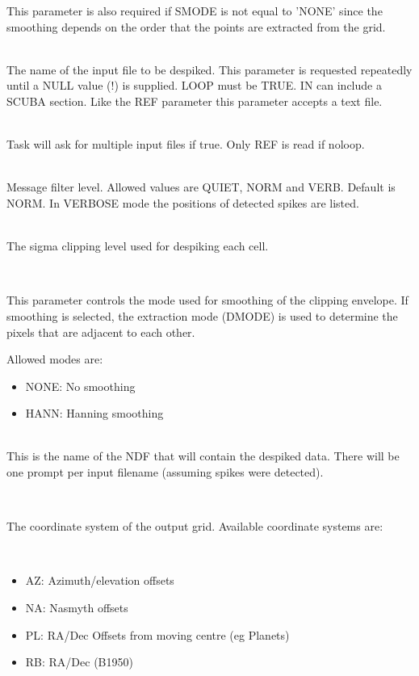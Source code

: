 \documentclass[twoside,11pt]{article}
\newcommand{\htmlref}[2]{#1}
\renewcommand{\_}{\texttt{\symbol{95}}}
\newcommand{\sstsubsection}[1]{ \item[{#1}] \mbox{} \\}
\newcommand{\sstitemlist}[1]{
  \mbox{} \\
  \vspace{-3.5ex}
  \begin{itemize}
     #1
  \end{itemize}
}
\newcommand{\sstitem}{\item}
\newcommand{\sstsubsection}[1]{\item[{#1}]}
\newcommand{\sstitemlist}[1]{
      \begin{itemize}
         #1
      \end{itemize}
      \\
   }
\newcommand{\sstitem}{\item}
\begin{document}
{{{        This parameter is also required if SMODE is not equal to
        'NONE' since the smoothing depends on the order that the points
        are extracted from the grid.
      }
      \sstsubsection{
         IN = CHAR (Read)
      }{
         The name of the input file to be despiked. This parameter is requested
         repeatedly until a NULL value (!) is supplied. LOOP must be TRUE.
         IN can include a \htmlref{SCUBA section}{sections}.
         Like the REF parameter this parameter accepts a text file.
      }
      \sstsubsection{
         LOOP = LOGICAL (Read)
      }{
         Task will ask for multiple input files if true. Only REF is read
         if noloop.
      }
      \sstsubsection{
         MSG\_FILTER = CHAR (Read)
      }{
         Message filter level. Allowed values are QUIET, NORM and VERB.
         Default is NORM. In VERBOSE mode the positions 
         of detected spikes are listed.
      }
      \sstsubsection{
         NSIGMA = REAL (Read)
      }{
         The sigma clipping level used for despiking each cell.
      }
      \sstsubsection{
         SMODE = CHAR (Given)
      }{
        This parameter controls the mode used for smoothing of the clipping
        envelope. If smoothing is selected, the extraction mode (DMODE) is used
        to determine the pixels that are adjacent to each other.

        Allowed modes are:

        \begin{itemize}
         \item NONE:  No smoothing
         \item HANN: Hanning smoothing 
        \end{itemize}
      }
      \sstsubsection{
         OUT = NDF (Write)
      }{
         This is the name of the NDF that will contain the despiked
         data. There will be one prompt per input filename (assuming spikes
         were detected). 
      }
      \sstsubsection{
         OUT\_COORDS = CHAR (Read)
      }{
         The coordinate system of the output grid. Available coordinate
         systems are:
         \sstitemlist{

            \sstitem
            AZ:  Azimuth/elevation offsets

            \sstitem
            NA:  Nasmyth offsets

            \sstitem
            PL:  RA/Dec Offsets from moving centre (eg Planets)

            \sstitem
            RB:  RA/Dec (B1950)

}}}}
\end{document}
